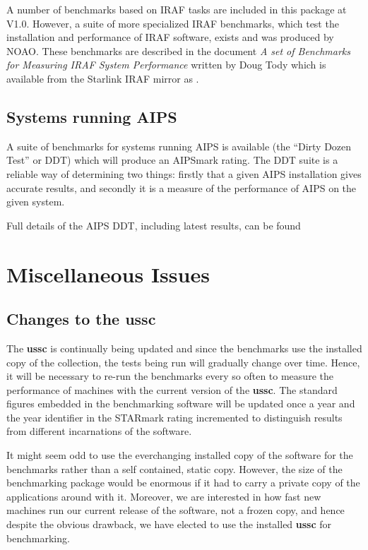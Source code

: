 A number of benchmarks based on IRAF tasks are included in this package
at V1.0. However, a suite of more specialized IRAF benchmarks, which
test the installation and performance of IRAF software, exists and was
produced by NOAO. These benchmarks are described in the document {\em A
set of Benchmarks for Measuring IRAF System Performance} written by
Doug Tody which is available from the Starlink IRAF mirror as
.


\subsection{Systems running AIPS}

A suite of benchmarks for systems running AIPS is available (the ``Dirty Dozen
Test'' or DDT) which will produce an AIPSmark rating. 
The DDT suite is a reliable way of determining two things: 
firstly that a given AIPS installation gives accurate results, and 
secondly it is a measure of the performance of AIPS on the given system. 

Full details of the AIPS DDT, including latest results, can be found  

\section{Miscellaneous Issues}

\subsection{Changes to the ussc}
\label{ussc-changes}

The {\bf ussc} is continually being updated and since the benchmarks use the 
installed copy of the collection, the tests being run will gradually
change over time. Hence, it will be necessary to re-run the benchmarks
every so often to measure the performance of machines with the current
version of the {\bf ussc}. The standard figures embedded in the benchmarking
software will be updated once a year and the year identifier in the
STARmark rating incremented to distinguish results from different 
incarnations of the software.

It might seem odd to use the everchanging installed copy of the 
software for the benchmarks rather than a self contained, static copy.
However, the size of the benchmarking package would be enormous if
it had to carry a private copy of the applications around with it.
Moreover, we are interested in how fast new machines run our current
release of the software, not a frozen copy, and hence despite the
obvious drawback, we have elected to use the installed {\bf ussc} for
benchmarking.

